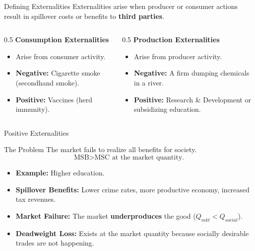 \documentclass{beamer}
\begin{document}
\begin{frame}{Defining Externalities}
    Externalities arise when producer or consumer actions result in spillover costs or benefits to \textbf{third parties}.

    \begin{columns}
        \begin{column}{0.5\textwidth}
            \textbf{Consumption Externalities}
            \begin{itemize}
                \item Arise from consumer activity.
                \item \textbf{Negative:} Cigarette smoke (secondhand smoke).
                \item \textbf{Positive:} Vaccines (herd immunity).
            \end{itemize}
        \end{column}
        \begin{column}{0.5\textwidth}
            \textbf{Production Externalities}
            \begin{itemize}
                \item Arise from producer activity.
                \item \textbf{Negative:} A firm dumping chemicals in a river.
                \item \textbf{Positive:} Research \& Development or subsidizing education.
            \end{itemize}
        \end{column}
    \end{columns}
\end{frame}

\begin{frame}{Positive Externalities}
    \begin{alertblock}{The Problem}
        The market fails to realize all benefits for society.
        \[ \text{MSB} > \text{MSC} \text{ at the market quantity.} \]
    \end{alertblock}

    \begin{itemize}
        \item \textbf{Example:} Higher education.
        \item \textbf{Spillover Benefits:} Lower crime rates, more productive economy, increased tax revenues.
        \item \textbf{Market Failure:} The market \textbf{underproduces} the good ($Q_{mkt} < Q_{social}$).
        \item \textbf{Deadweight Loss:} Exists at the market quantity because socially desirable trades are not happening.
    \end{itemize}
\end{frame}
\end{document}

